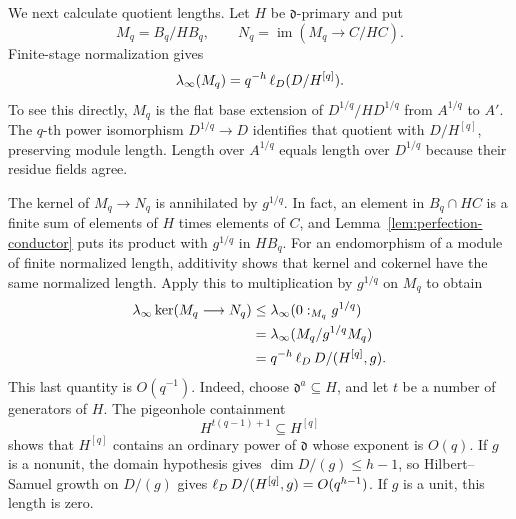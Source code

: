 We next calculate quotient lengths. Let $H$ be $\mathfrak d$-primary and put
\[
 M_q=B_q/HB_q,\qquad
 N_q=\operatorname{im}(M_q\longrightarrow C/HC).
\]
Finite-stage normalization gives
\begin{equation}\label{eq:perfection-stage-quotient}
 \lambda_\infty(M_q)=q^{-h}\operatorname{\ell}_D(D/H^{[q]}).
\end{equation}
To see this directly, $M_q$ is the flat base extension of
$D^{1/q}/HD^{1/q}$ from $A^{1/q}$ to $A'$.  The $q$-th power
isomorphism $D^{1/q}\longrightarrow D$ identifies that quotient with
$D/H^{[q]}$, preserving module length.  Length over $A^{1/q}$ equals
length over $D^{1/q}$ because their residue fields agree.

The kernel of $M_q\longrightarrow N_q$ is annihilated by $g^{1/q}$.
In fact, an element in $B_q\cap HC$ is a finite sum of elements of
$H$ times elements of $C$, and Lemma~\ref{lem:perfection-conductor}
puts its product with $g^{1/q}$ in $HB_q$.
For an endomorphism of a module of finite normalized length,
additivity shows that kernel and cokernel have the same normalized
length.  Apply this to multiplication by $g^{1/q}$ on $M_q$ to obtain
\begin{align}
 \lambda_\infty\ker(M_q\longrightarrow N_q)
 &\leq\lambda_\infty(0:_{M_q}g^{1/q})\notag\\
 &=\lambda_\infty(M_q/g^{1/q}M_q)\notag\\
 &=q^{-h}\operatorname{\ell}_D D/(H^{[q]},g).
 \label{eq:perfection-kernel-bound}
\end{align}
This last quantity is $O(q^{-1})$.  Indeed, choose
$\mathfrak d^a\subseteq H$, and let $t$ be a number of generators of
$H$.  The pigeonhole containment
\[
 H^{t(q-1)+1}\subseteq H^{[q]}
\]
shows that $H^{[q]}$ contains an ordinary power of $\mathfrak d$ whose
exponent is $O(q)$.  If $g$ is a nonunit, the domain hypothesis gives
$\dim D/(g)\leq h-1$, so Hilbert--Samuel growth on $D/(g)$ gives
$\operatorname{\ell}_D D/(H^{[q]},g)=O(q^{h-1})$.  If $g$ is a unit, this length
is zero.

